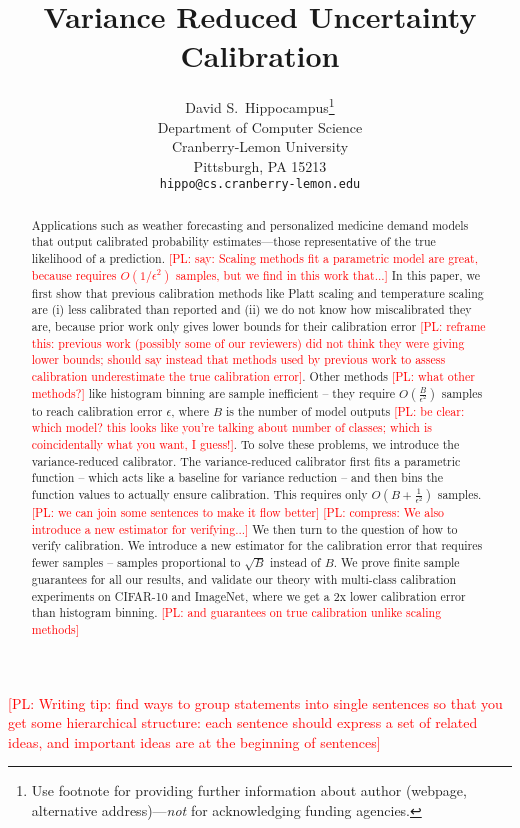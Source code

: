 \documentclass{article}
\title{Variance Reduced Uncertainty Calibration}
\author{%
  David S.~Hippocampus\thanks{Use footnote for providing further information
    about author (webpage, alternative address)---\emph{not} for acknowledging
    funding agencies.} \\
  Department of Computer Science\\
  Cranberry-Lemon University\\
  Pittsburgh, PA 15213 \\
  \texttt{hippo@cs.cranberry-lemon.edu} \\
}
\newcommand{\pl}[1]{\textcolor{red}{[PL: #1]}}
\begin{document}
\maketitle

\begin{abstract}
Applications such as weather forecasting and personalized medicine demand models that output calibrated probability estimates---those representative of the true likelihood of a prediction.
  \pl{say: Scaling methods fit a parametric model are great, because requires $O(1/\epsilon^2)$ samples, but we find in this work that...}
In this paper, we first show that previous calibration methods like Platt scaling and temperature scaling are (i) less calibrated than reported and (ii) we do not know how miscalibrated they are, because prior work only gives lower bounds for their calibration error \pl{reframe this: previous work (possibly some of our reviewers) did not think they were giving lower bounds; should say instead that methods used by previous work to assess calibration underestimate the true calibration error}.
  Other methods \pl{what other methods?} like histogram binning are sample inefficient -- they require $O(\frac{B}{\epsilon^2})$ samples to reach calibration error $\epsilon$, where $B$ is the number of model outputs \pl{be clear: which model? this looks like you're talking about number of classes; which is coincidentally what you want, I guess!}. To solve these problems, we introduce the variance-reduced calibrator.
  The variance-reduced calibrator first fits a parametric function -- which acts like a baseline for variance reduction -- and then bins the function values to actually ensure calibration. This requires only $O(B + \frac{1}{\epsilon^2})$ samples. \pl{we can join some sentences to make it flow better}
  \pl{compress: We also introduce a new estimator for verifying...}
  We then turn to the question of how to verify calibration. We introduce a new estimator for the calibration error that requires fewer samples -- samples proportional to $\sqrt{B}$ instead of $B$. We prove finite sample guarantees for all our results, and validate our theory with multi-class calibration experiments on CIFAR-10 and ImageNet, where we get a 2x lower calibration error than histogram binning. \pl{and guarantees on true calibration unlike scaling methods}
\end{abstract}

\pl{Writing tip: find ways to group statements into single sentences so that you get some hierarchical structure:
each sentence should express a set of related ideas, and important ideas are at the beginning of sentences}
\end{document}
